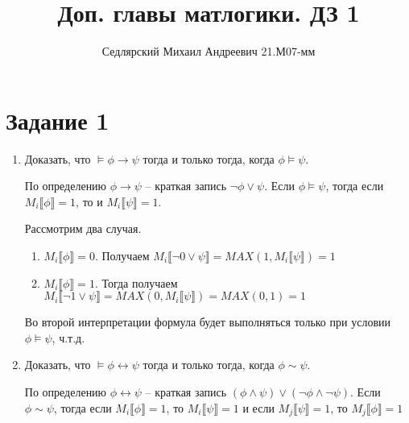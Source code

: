 \documentclass{article}
\title{Доп. главы матлогики. ДЗ 1}
\author{Седлярский Михаил Андреевич 21.М07-мм}
\date{ }
\begin{document}
\maketitle

\section*{Задание 1}
\begin{enumerate}
    \item
          Доказать, что \(\models \phi \rightarrow \psi\) тогда и только тогда, когда \(\phi \models{\psi}\).

          По определению \(\phi \rightarrow \psi\) -- краткая запись \(\neg \phi \lor \psi\).
          Если \(\phi \models{\psi}\), тогда если \(M_i\llbracket \phi \rrbracket = 1\), то и \(M_i\llbracket \psi \rrbracket = 1\).

          Рассмотрим два случая.
          \begin{enumerate}
              \item
                    \(M_i\llbracket \phi \rrbracket = 0\).
                    Получаем \(M_i\llbracket \neg 0 \lor \psi \rrbracket = MAX(1, M_i\llbracket \psi \rrbracket) = 1\)
              \item
                    \(M_i\llbracket \phi \rrbracket = 1\).
                    Тогда получаем \(M_i\llbracket \neg 1 \lor \psi \rrbracket = MAX(0, M_i\llbracket \psi \rrbracket) = MAX(0, 1) = 1\)
          \end{enumerate}

          Во второй интерпретации формула будет выполняться только при условии \(\phi \models \psi\), ч.т.д.
    \item
          Доказать, что \(\models \phi \leftrightarrow \psi\) тогда и только тогда, когда \(\phi \sim \psi\).

          По определению \(\phi \leftrightarrow \psi\) -- краткая запись \((\phi \land \psi) \lor (\neg \phi \land \neg \psi)\).
          Если \(\phi \sim \psi\), тогда если \(M_i\llbracket \phi \rrbracket = 1\),
          то \(
          M_i\llbracket \psi \rrbracket = 1\) и если
          \(M_j\llbracket \psi \rrbracket = 1\), то
          \(M_j\llbracket \phi \rrbracket = 1
          \)


\end{enumerate}
\end{document}
